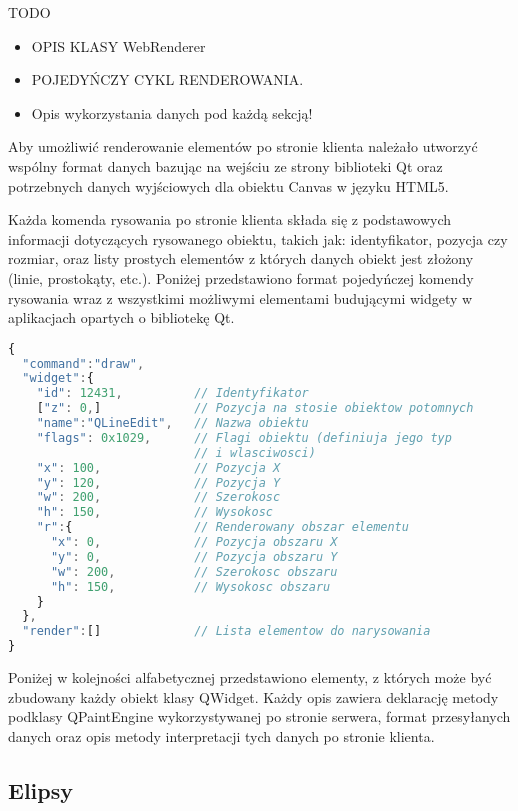 TODO
\begin{itemize}
\item{OPIS KLASY WebRenderer}
\item{POJEDYŃCZY CYKL RENDEROWANIA.}
\item Opis wykorzystania danych pod każdą sekcją!
\end{itemize}

Aby umożliwić renderowanie elementów po stronie klienta należało utworzyć wspólny format danych bazując na wejściu ze strony biblioteki Qt oraz potrzebnych danych wyjściowych dla obiektu Canvas w języku HTML5. 

Każda komenda rysowania po stronie klienta składa się z podstawowych informacji dotyczących rysowanego obiektu, takich jak: identyfikator, pozycja czy rozmiar, oraz listy prostych elementów z których danych obiekt jest złożony (linie, prostokąty, etc.). Poniżej przedstawiono format pojedyńczej komendy rysowania wraz z wszystkimi możliwymi elementami budującymi widgety w aplikacjach opartych o bibliotekę Qt.


\begin{lstlisting}[language=JavaScript,numbers=none,caption=Komenda renderowania elementu interfejsu]
{
  "command":"draw",
  "widget":{
    "id": 12431,          // Identyfikator
    ["z": 0,]             // Pozycja na stosie obiektow potomnych
    "name":"QLineEdit",   // Nazwa obiektu
    "flags": 0x1029,      // Flagi obiektu (definiuja jego typ 
                          // i wlasciwosci)
    "x": 100,             // Pozycja X
    "y": 120,             // Pozycja Y
    "w": 200,             // Szerokosc
    "h": 150,             // Wysokosc
    "r":{                 // Renderowany obszar elementu
      "x": 0,             // Pozycja obszaru X
      "y": 0,             // Pozycja obszaru Y
      "w": 200,           // Szerokosc obszaru
      "h": 150,           // Wysokosc obszaru
    }
  },
  "render":[]             // Lista elementow do narysowania
}
\end{lstlisting}

Poniżej w kolejności alfabetycznej przedstawiono elementy, z których może być zbudowany każdy obiekt klasy QWidget. Każdy opis zawiera deklarację metody podklasy QPaintEngine wykorzystywanej po stronie serwera, format przesyłanych danych oraz opis metody interpretacji tych danych po stronie klienta.

\subsection{Elipsy}


